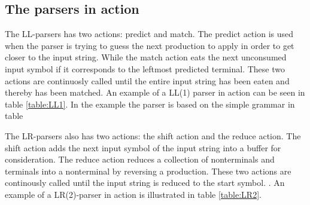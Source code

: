 \subsection{The parsers in action} 
The LL-parsers has two actions: predict and match. The predict action is used when the parser is trying to guess the next production to apply in order to get closer to the input string. While the match action eats the next unconsumed input symbol if it corresponds to the leftmost predicted terminal. These two actions are continuosly called until the entire input string has been eaten and thereby has been matched. An example of a LL(1) parser in action can be seen in table \ref{table:LL1}. In the example the parser is based on the simple grammar in table 

\centering
\begin{ebnf}
\end{ebnf}

The LR-parsers also has two actions: the shift action and the reduce action. The shift action adds the next input symbol of the input string into a buffer for consideration. The reduce action reduces a collection of nonterminals and terminals into a nonterminal by reversing a production. These two actions are
continously called until the input string is reduced to the start symbol. \cite{LL(1)andLR(2)inaction}. An example of a LR(2)-parser in action is illustrated in table \ref{table:LR2}.

